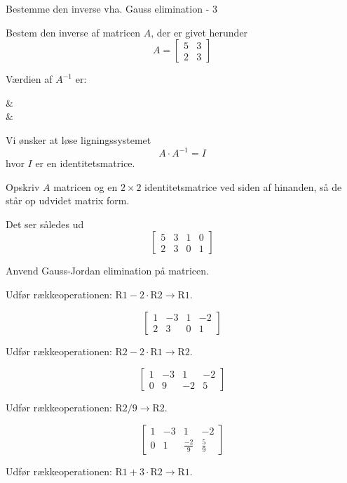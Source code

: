 \documentclass{article}
\begin{document}
\begin{exercise}{Bestemme den inverse vha. Gauss elimination - 3}
	
	Bestem den inverse af matricen $A$, der er givet herunder
	\[
	A = \left[\begin{array}{cc}
	5 & 3 \\ 
	2 & 3
	\end{array} \right]
	\]
	
	Værdien af $A^{-1}$ er:
	\begin{answermatrix}
		 &  \\
		 & 
	\end{answermatrix}
	
	\hint
	Vi ønsker at løse ligningssystemet
	\[
	A \cdot A^{-1} = I
	\]
	hvor $I$ er en identitetsmatrice.
	
	\hint
	Opskriv $A$ matricen og en $2 \times 2$ identitetsmatrice
	ved siden af hinanden, så de står op udvidet matrix form.
	
	\hint
	Det ser således ud
	\[
	\left[\begin{array}{cc|cc}
	5 & 3 & 1 & 0 \\ 
	2 & 3 & 0 & 1
	\end{array} \right]
	\]
	
	\hint
	Anvend Gauss-Jordan elimination på matricen.
	
	\hint
	Udfør rækkeoperationen: $\text{R1} - 2 \cdot \text{R2} \to \text{R1}$.
	
	\hint
	\[
	\left[\begin{array}{cc|cc}
	1 & -3 & 1 & -2 \\ 
	2 & 3 & 0 & 1
	\end{array} \right]
	\]
	
	\hint
	Udfør rækkeoperationen: $\text{R2} - 2 \cdot \text{R1} \to \text{R2}$.
	
	\hint
	\[
	\left[\begin{array}{cc|cc}
	1 & -3 & 1 & -2 \\ 
	0 & 9 & -2 & 5
	\end{array} \right]
	\]
	
	\hint
	Udfør rækkeoperationen: $\text{R2} / 9 \to \text{R2}$.
	
	\hint
	\[
	\left[\begin{array}{cc|cc}
	1 & -3 & 1 & -2 \\ 
	0 & 1 & \frac{-2}{9} & \frac{5}{9}
	\end{array} \right]
	\]
	
	\hint
	Udfør rækkeoperationen: $\text{R1} + 3 \cdot \text{R2} \to \text{R1}$.
	

\end{exercise}
\end{document}

